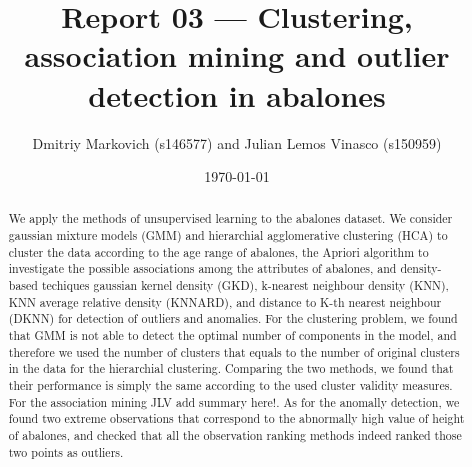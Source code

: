 \documentclass[10pt, paper=a4]{article}
\begin{document}
\title{Report 03 --- Clustering, association mining and outlier detection in
  abalones}

\author{Dmitriy Markovich (s146577) and Julian Lemos Vinasco (s150959)}

\date{\today}

\maketitle

\begin{abstract}

  We apply the methods of unsupervised learning to the abalones dataset.  We
  consider gaussian mixture models (GMM) and hierarchial agglomerative
  clustering (HCA) to cluster the data according to the age range of abalones,
  the Apriori algorithm to investigate the possible associations among the
  attributes of abalones, and density-based techiques gaussian kernel density
  (GKD), k-nearest neighbour density (KNN), KNN average relative density
  (KNNARD), and distance to K-th nearest neighbour (DKNN) for detection of
  outliers and anomalies.  For the clustering problem, we found that GMM is not
  able to detect the optimal number of components in the model, and therefore we
  used the number of clusters that equals to the number of original clusters in
  the data for the hierarchial clustering.  Comparing the two methods, we found
  that their performance is simply the same according to the used cluster
  validity measures.  For the association mining {\color{red} JLV add summary
    here!}.  As for the anomally detection, we found two extreme observations
  that correspond to the abnormally high value of height of abalones, and
  checked that all the observation ranking methods indeed ranked those two
  points as outliers.
\end{abstract}

\end{document}
